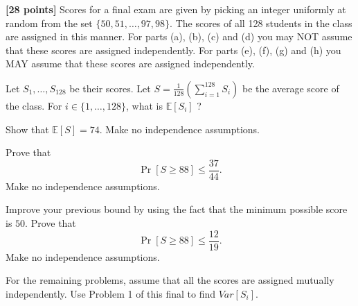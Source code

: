 \documentclass[12pt,oneside]{article}
\begin{document}
\begin{problem}
{\bf [28 points]}
Scores for a final exam are given by picking an integer uniformly at random from the set $\{50, 51, \ldots, 97, 98\}$.
The scores of all 128 students in the class are assigned in this manner. For parts (a), (b), (c) and (d) you may NOT assume that
these scores are assigned independently. For parts (e), (f), (g) and (h) you MAY assume that these scores are assigned independently.

Let $S_1, \ldots, S_{128}$ be their scores. Let $S = \frac{1}{128} (\sum_{i=1}^{128} S_i)$ be the average score of the class.
\bparts
\ppart {\bf [3 points]}
For $i\in \{1, \ldots, 128\}$, what is $\mathbb E[S_i]$ ?



\ppart {\bf [2 points]}
Show that $\mathbb E[S] = 74$. Make no independence assumptions.


\ppart {\bf [4 points]}
Prove that
$$\Pr[S \geq 88] \leq \frac{37}{44}.$$
Make no independence assumptions.


\ppart {\bf [5 points]}
Improve your previous bound by using the fact that the minimum possible score is $50$. Prove that
$$\Pr[S \geq 88] \leq \frac{12}{19}.$$
Make no independence assumptions.



\ppart {\bf [4 points]}
For the remaining problems, assume that all the scores are assigned mutually independently. Use Problem 1 of this final to find $Var[S_i]$.

\end{problem}
\end{document}
